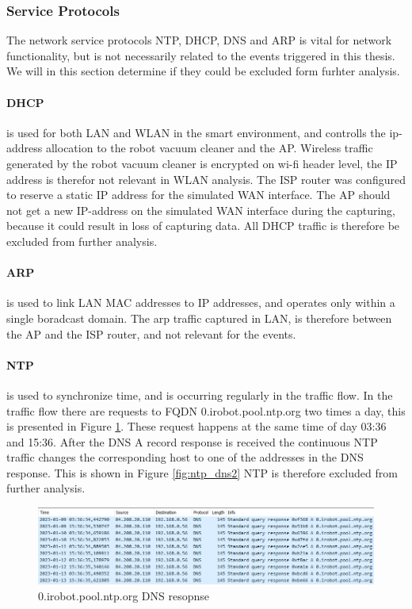 \subsubsection{Service Protocols}
The network service protocols NTP, DHCP, DNS and ARP is vital for network functionality, but is not necessarily related to the events triggered in this thesis. We will in this section determine if they could be excluded form furhter analysis.  

\paragraph{DHCP} \cite{rfc2131_dhcp} is used for both LAN and WLAN in the smart environment, and controlls the ip-address allocation to the robot vacuum cleaner and the AP. Wireless traffic generated by the robot vacuum cleaner is encrypted on wi-fi header level, the IP address is therefor not relevant in WLAN analysis. The ISP router was configured to reserve a static IP address for the simulated WAN interface. The AP should not get a new IP-address on the simulated WAN interface during the capturing, because it could result in loss of capturing data. All DHCP traffic is therefore be excluded from further analysis.

\paragraph{ARP} is used to link LAN MAC addresses to IP addresses, and operates only within a single boradcast domain. The arp traffic captured in LAN, is therefore between the AP and the ISP router, and not relevant for the events. 

\paragraph{NTP} is used to synchronize time, and is occurring regularly in the traffic flow. In the traffic flow there are requests to FQDN 0.irobot.pool.ntp.org two times a day, this is presented in Figure \ref{fig:ntp_dns}. These request happens at the same time of day 03:36 and 15:36. After the DNS A record response is received the continuous NTP traffic changes the corresponding host to one of the addresses in the DNS response. This is shown in Figure \ref{fig:ntp_dns2} NTP is therefore excluded from further analysis.

\begin{figure}[H]
    \centering
    \includegraphics[width=\textwidth]{figures/NTP_wireshark .png}
    \caption{0.irobot.pool.ntp.org DNS resopnse}
    \label{fig:ntp_dns}
\end{figure}

